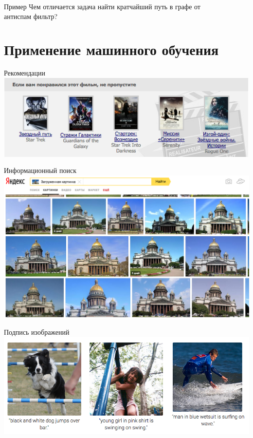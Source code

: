 \documentclass[10pt]{beamer}
\begin{document}
\begin{frame}{Пример}
  Чем отличается задача \alert{найти кратчайший путь в графе} от\\  \alert{антиспам фильтр}?
\end{frame}

\section{Применение машинного обучения}

{
\begin{frame}{Рекомендации}
  \centering
  \includegraphics[width=\linewidth, height=\textheight, keepaspectratio]{images/recommendations}\\
\end{frame}
}

{
\begin{frame}{Информационный поиск}
  \centering
  \includegraphics[width=\linewidth, height=\textheight, keepaspectratio]{images/similar_image}\\
\end{frame}
}

{
\begin{frame}{Подпись изображений}
  \centering
  \includegraphics[width=\linewidth, height=\textheight, keepaspectratio]{images/image_captioning}\\
\end{frame}
}
\end{document}
